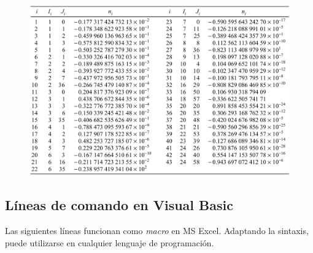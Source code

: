 \documentclass[10pt,a4paper]{article}
\begin{document}
\begin{figure}[hbtp]
\centering
\includegraphics[scale=0.35]{Captura02.PNG}
\end{figure}

\subsection*{Líneas de comando en Visual Basic}

Las siguientes líneas funcionan como \textit{macro} en MS Excel. Adaptando la sintaxis, puede utilizarse en cualquier lenguaje de programación.
\end{document}
